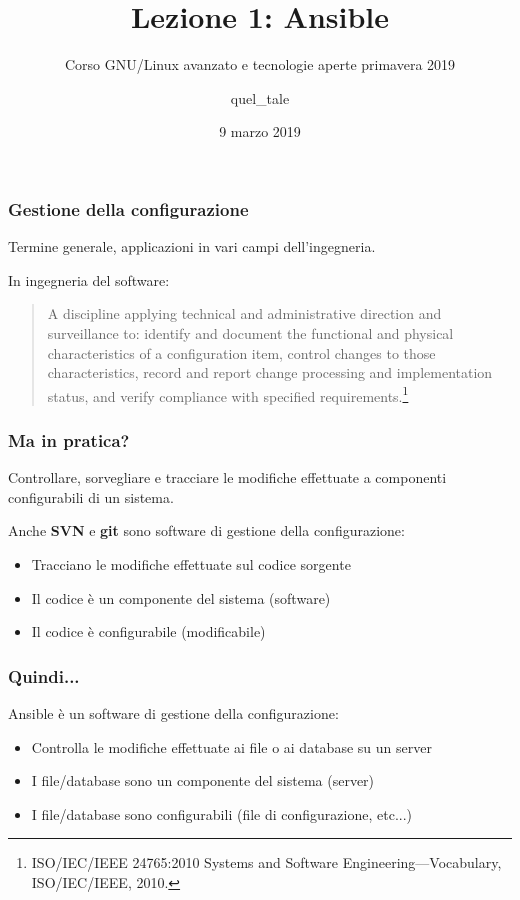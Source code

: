 \documentclass{beamer}
\title[Ansible]{Lezione 1: Ansible}
\subtitle{Corso GNU/Linux avanzato e tecnologie aperte primavera 2019}
\author{quel\_tale}
\institute{WEEE Open}
\date[2019]{9 marzo 2019}
\begin{document}
	
\frame{\titlepage}
	
\begin{frame}
\frametitle{Gestione della configurazione}
	Termine generale, applicazioni in vari campi dell'ingegneria.
	
	In ingegneria del software:
	\newline
	
	\begin{quote}
		A discipline applying technical and administrative direction and surveillance to: identify and document the functional and physical characteristics of a configuration item, control changes to those characteristics, record and report change processing and implementation status, and verify compliance with specified requirements.\footnote{ISO/IEC/IEEE 24765:2010 Systems and Software Engineering—Vocabulary, ISO/IEC/IEEE, 2010.}
	\end{quote}
\end{frame}

\begin{frame}
\frametitle{Ma in pratica?}
Controllare, sorvegliare e tracciare le modifiche effettuate a componenti configurabili di un sistema.

Anche \textbf{SVN} e \textbf{git} sono software di gestione della configurazione:
\begin{itemize}
	\item Tracciano le modifiche effettuate sul codice sorgente
	\item Il codice è un componente del sistema (software)
	\item Il codice è configurabile (modificabile)
\end{itemize}
\end{frame}

\begin{frame}
\frametitle{Quindi...}
Ansible è un software di gestione della configurazione:
\begin{itemize}
	\item Controlla le modifiche effettuate ai file o ai database su un server
	\item I file/database sono un componente del sistema (server)
	\item I file/database sono configurabili (file di configurazione, etc...)
\end{itemize}
\end{frame}
\end{document}

